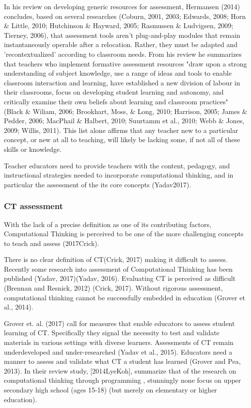 In his review on developing generic resources for assessment, Hermansen (2014) concludes, based on several researches (Coburn, 2001, 2003; Edwards, 2008; Horn \& Little, 2010; Hutchinson \& Hayward, 2005; Rasmussen \& Ludvigsen, 2009; Tierney, 2006), that assessment tools aren't plug-and-play modules that remain instantaneously operable after a relocation. Rather, they must be adapted  and 'recontextualized' according to classroom needs. From his review he summarizes that teachers who implement formative assessment resources "draw upon a strong understanding of subject knowledge, use a range of ideas and tools to enable classroom interaction and learning, have established a new division of labour in their classrooms, focus on developing student learning and autonomy, and critically examine their own beliefs about learning and classroom practices" (Black \& Wiliam, 2006; Brookhart, Moss, \& Long, 2010; Harrison, 2005; James \& Pedder, 2006; MacPhail \& Halbert, 2010; Suurtamm et al., 2010; Webb \& Jones, 2009; Willis, 2011). This list alone affirms that any teacher new to a particular concept, or new at all to teaching, will likely be lacking some, if not all of these skills or knowledge.


Teacher educators need to provide teachers with the content, pedagogy, and instructional strategies needed to incorporate computational thinking, and in particular the assessment of the its core concepts (Yadav2017).



\subsubsection*{CT assessment}
With the lack of a precise definition as one of its contributing factors, Computational Thinking is perceived to be one of the more challenging concepts to teach and assess (2017Crick).

There is no clear definition of CT(Crick, 2017) making it difficult to assess. Recently some research into assessment of Computational Thinking has been published (Yadav, 2017)(Yadav, 2016). Evaluating CT is perceived as difficult (Brennan and Resnick, 2012) (Crick, 2017).
Without rigorous assessment, computational thinking cannot be successfully embedded in education (Grover et al., 2014).

Grover et. al. (2017) call for measures that enable educators to assess student learning of CT.  Specifically they signal the necessity to test and validate materials in various settings with diverse learners.
Assessments of CT remain underdeveloped and under-researched (Yadav et al., 2015).
Educators need a manner to assess and validate what CT a student has learned (Grover and Pea, 2013).
In their review study, [2014LyeKoh], summarize that of the research on computational thinking through programming , stunningly none focus on upper secondary high school (ages 15-18) (but merely on elementary or higher education).


